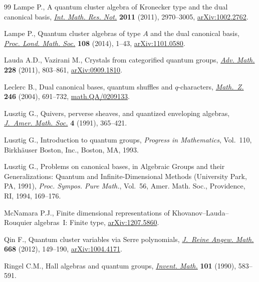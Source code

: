 \documentclass[pdftex]{sigma}
\numberwithin{equation}{section}
\begin{document}
\begin{thebibliography}{99}
Lampe P., A quantum cluster algebra of {K}ronecker type and the dual canonical
  basis, \href{http://dx.doi.org/10.1093/imrn/rnq162}{\textit{Int. Math. Res. Not.}} \textbf{2011} (2011), 2970--3005,
  \href{http://arxiv.org/abs/1002.2762}{arXiv:1002.2762}.

Lampe P., Quantum cluster algebras of type {$A$} and the dual canonical basis,
  \href{http://dx.doi.org/10.1112/plms/pds098}{\textit{Proc. Lond. Math. Soc.}} \textbf{108} (2014), 1--43,
  \href{http://arxiv.org/abs/1101.0580}{arXiv:1101.0580}.

Lauda A.D., Vazirani M., Crystals from categorif\/ied quantum groups,
  \href{http://dx.doi.org/10.1016/j.aim.2011.06.009}{\textit{Adv. Math.}} \textbf{228} (2011), 803--861, \href{http://arxiv.org/abs/0909.1810}{arXiv:0909.1810}.

Leclerc B., Dual canonical bases, quantum shuf\/f\/les and {$q$}-characters,
  \href{http://dx.doi.org/10.1007/s00209-003-0609-9}{\textit{Math.~Z.}} \textbf{246} (2004), 691--732, \href{http://arxiv.org/abs/math.QA/0209133}{math.QA/0209133}.

Lusztig G., Quivers, perverse sheaves, and quantized enveloping algebras,
  \href{http://dx.doi.org/10.2307/2939279}{\textit{J.~Amer. Math. Soc.}} \textbf{4} (1991), 365--421.

Lusztig G., Introduction to quantum groups, \textit{Progress in Mathematics},
  Vol.~110, Birkh\"auser Boston, Inc., Boston, MA, 1993.

Lusztig G., Problems on canonical bases, in Algebraic Groups and their
  Generalizations: Quantum and Inf\/inite-Dimensional Methods ({U}niversity
  {P}ark, {PA}, 1991), \textit{Proc. Sympos. Pure Math.}, Vol.~56, Amer. Math.
  Soc., Providence, RI, 1994, 169--176.

McNamara P.J., Finite dimensional representations of Khovanov--Lauda--Rouquier
  algebras~I: Finite type, \href{http://arxiv.org/abs/1207.5860}{arXiv:1207.5860}.

Qin F., Quantum cluster variables via {S}erre polynomials, \href{http://dx.doi.org/10.1515/CRELLE.2011.129}{\textit{J.~Reine
  Angew. Math.}} \textbf{668} (2012), 149--190, \href{http://arxiv.org/abs/1004.4171}{arXiv:1004.4171}.

Ringel C.M., Hall algebras and quantum groups, \href{http://dx.doi.org/10.1007/BF01231516}{\textit{Invent. Math.}}
  \textbf{101} (1990), 583--591.


\end{thebibliography}
\end{document}
